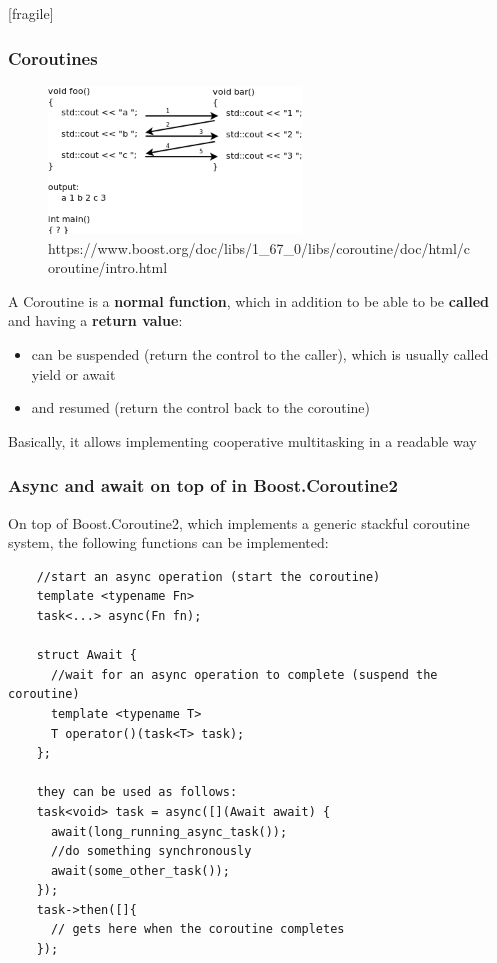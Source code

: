\begin{frame}{[fragile]}
  \frametitle{Coroutines}
  \begin{figure}[ht]
    \centering
    \includegraphics[width=0.6\textwidth]{img/foo_bar}\\
    {\tiny https://www.boost.org/doc/libs/1\_67\_0/libs/coroutine/doc/html/coroutine/intro.html}\\
  \end{figure}

  A Coroutine is a \textbf{normal function}, which in addition to be able to be \textbf{called} and having a \textbf{return value}:
  \begin{itemize}
    \item can be suspended (return the control to the caller), which is usually called yield or await
    \item and resumed (return the control back to the coroutine)
  \end{itemize}
  Basically, it allows implementing cooperative multitasking in a readable way
\end{frame}%

\begin{frame}[fragile]
  \frametitle{Async and await on top of  in Boost.Coroutine2}
  On top of Boost.Coroutine2, which implements a generic stackful coroutine system, the following functions can be implemented:
  \begin{verbatim}
    //start an async operation (start the coroutine)
    template <typename Fn>
    task<...> async(Fn fn);

    struct Await {
      //wait for an async operation to complete (suspend the coroutine)
      template <typename T>
      T operator()(task<T> task);
    };

    they can be used as follows:
    task<void> task = async([](Await await) {
      await(long_running_async_task());
      //do something synchronously
      await(some_other_task());
    });
    task->then([]{
      // gets here when the coroutine completes
    });
  \end{verbatim}
\end{frame}


